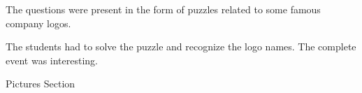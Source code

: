 \documentclass[12pt, a4 paper]{article}
\begin{document}
\begin{center}
\begin{Large}
\begin{multicols}{2}
\end{multicols}

\begin{multicols}{2}

\columnbreak
  The questions were present in the form of puzzles related to some famous company logos. 
\end{multicols} 

\begin{multicols}{2}
The students had to solve the puzzle and recognize the logo names. The complete event was interesting.

\columnbreak
  
\end{multicols} 
  
\end{Large} 
\end{center}

\newpage 


\begin{center}
\Huge Pictures Section
\end{center}

\newpage 
\end{document}
